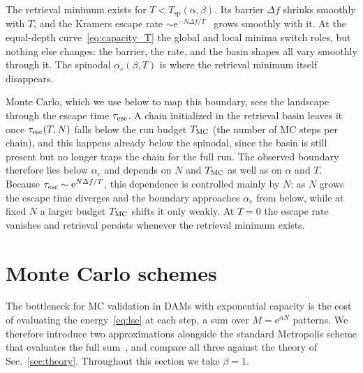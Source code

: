 \documentclass[letterpaper]{article} %
\newcommand{\e}{{\mathrm{e}}}
\newcommand{\Bnet}{\beta}
\newcommand{\ac}{\alpha_c}
\begin{document}

The retrieval minimum exists for $T < T_{\mathrm{sp}}(\alpha, \Bnet)$. Its barrier $\Delta f$ shrinks smoothly with $T$, and the Kramers escape rate $\sim \e^{-N \Delta f / T}$~\citep{kramers1940, hanggi1990} grows smoothly with it. At the equal-depth curve~\eqref{eq:capacity_T} the global and local minima switch roles, but nothing else changes: the barrier, the rate, and the basin shapes all vary smoothly through it. The spinodal $\ac(\Bnet, T)$ is where the retrieval minimum itself disappears.

Monte Carlo, which we use below to map this boundary, sees the landscape through the escape time $\tau_{\rm esc}$. A chain initialized in the retrieval basin leaves it once $\tau_{\rm esc}(T, N)$ falls below the run budget $T_{\rm MC}$ (the number of MC steps per chain), and this happens already below the spinodal, since the basin is still present but no longer traps the chain for the full run. The observed boundary therefore lies below $\ac$ and depends on $N$ and $T_{\rm MC}$ as well as on $\alpha$ and $T$. Because $\tau_{\rm esc} \sim \e^{N\Delta f/T}$, this dependence is controlled mainly by $N$: as $N$ grows the escape time diverges and the boundary approaches $\ac$ from below, while at fixed $N$ a larger budget $T_{\rm MC}$ shifts it only weakly. At $T = 0$ the escape rate vanishes and retrieval persists whenever the retrieval minimum exists.


\section{Monte Carlo schemes}
\label{sec:mc}

The bottleneck for MC validation in DAMs with exponential capacity is the cost of evaluating the energy~\eqref{eq:lse} at each step, a sum over $M = \e^{\alpha N}$ patterns. We therefore introduce two approximations alongside the standard Metropolis scheme that evaluates the full sum~\citep[e.g.,][]{iclr2026mc}, and compare all three against the theory of Sec.~\ref{sec:theory}. Throughout this section we take $\Bnet = 1$.
\end{document}
